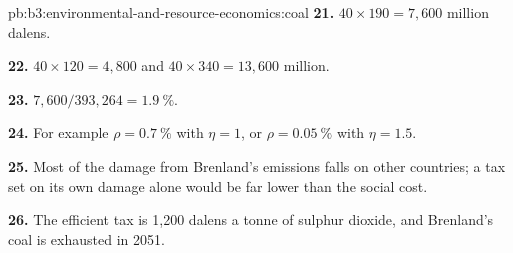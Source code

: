 \begin{solution}{pb:b3:environmental-and-resource-economics:coal}
\textbf{21.} $40 \times 190 = 7{,}600$ million dalens.

\textbf{22.} $40 \times 120 = 4{,}800$ and $40 \times 340 = 13{,}600$ million.

\textbf{23.} $7{,}600/393{,}264 = 1.9~\%$.

\textbf{24.} For example $\rho = 0.7~\%$ with $\eta = 1$, or $\rho = 0.05~\%$ with $\eta = 1.5$.

\textbf{25.} Most of the damage from Brenland's emissions falls on other countries; a tax
set on its own damage alone would be far lower than the social cost.

\textbf{26.} The efficient tax is 1{,}200 dalens a tonne of sulphur dioxide, and Brenland's coal is exhausted in 2051.
\end{solution}
